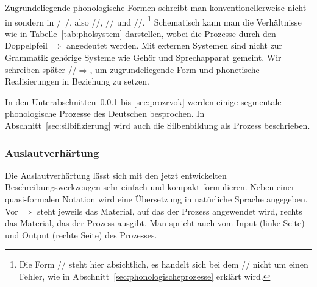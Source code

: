 Zugrundeliegende phonologische Formen schreibt man konventionellerweise nicht in \textipa{[~]} sondern in /~/, also \zB //, // und //.%
\footnote{Die Form // steht hier absichtlich, es handelt sich bei dem // nicht um einen Fehler, wie in Abschnitt~\ref{sec:phonologischeprozesse} erklärt wird.}
Schematisch kann man die Verhältnisse wie in Tabelle~\ref{tab:pholsystem} darstellen, wobei die Prozesse durch den Doppelpfeil $\Rightarrow$ angedeutet werden.
Mit externen Systemen sind nicht zur Grammatik gehörige Systeme wie Gehör und Sprechapparat gemeint.
Wir schreiben später //$\Rightarrow$\textipa{[ba:t]}, um zugrundeliegende Form und phonetische Realisierungen in Beziehung zu setzen.

\begin{table}[!h]
  \caption{Lexikon, Phonologie und Phonetik}
  \label{tab:pholsystem}
\end{table}

In den Unterabschnitten~\ref{sec:prozauslautverh} bis \ref{sec:prozrvok} werden einige segmentale phonologische Prozesse des Deutschen besprochen.
In Abschnitt~\ref{sec:silbifizierung} wird auch die Silbenbildung als Prozess beschrieben.

\subsubsection{Auslautverhärtung}

\label{sec:prozauslautverh}

Die Auslautverhärtung lässt sich mit den jetzt entwickelten Beschreibungswerkzeugen sehr einfach und kompakt formulieren.
Neben einer quasi-formalen Notation wird eine Übersetzung in natürliche Sprache angegeben.
Vor $\Rightarrow$ steht jeweils das Material, auf das der Prozess angewendet wird, rechts das Material, das der Prozess ausgibt.
Man spricht auch vom Input (linke Seite) und Output (rechte Seite) des Prozesses.

